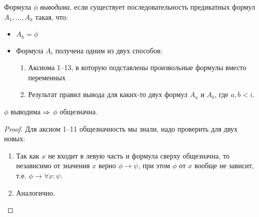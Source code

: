 \begin{Def}
	Формула $\phi$ \textit{выводима}, если существует последовательность предикатных формул $A_1, \dots, A_k$ такая, что:
	\begin{itemize}
	\item $A_k = \phi$
	\item Формула $A_i$ получена одним из двух способов:	
		\begin{enumerate}
		\item Аксиома 1--13, в которую подставлены произвольные формулы вместо переменных
		\item Результат правил вывода для каких-то двух формул $A_a$ и $A_b$, где $a, b < i$.
		\end{enumerate}
	\end{itemize}
\end{Def}
\begin{theorem}[о корректности]
	$\phi$ выводима $\Rightarrow$ $\phi$ общезначна.
\end{theorem}
\begin{proof}
	Для аксиом 1--11 общезначность мы знали, надо проверить для двух новых:
	\begin{enumerate}
		\item
			Так как $x$ не входит в левую часть и формула сверху общезначна,
			то независимо от значения $x$ верно $\phi \to \psi$, при этом $\phi$ от $x$ вообще не зависит,
			т.е. $\phi \to \forall x \colon \psi$.
		\item
			Аналогично. \TODO
	\end{enumerate}
\end{proof}


